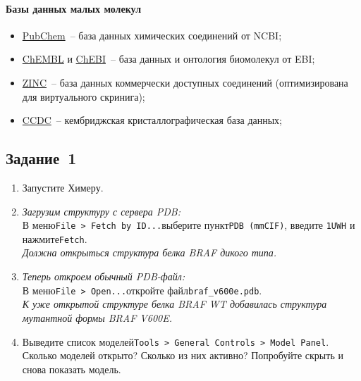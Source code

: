 \paragraph{Базы данных малых молекул}
\begin{itemize}
    \item \href{https://pubchem.ncbi.nlm.nih.gov/}{PubChem}~-- база данных химических соединений от NCBI;
    \item \href{https://www.ebi.ac.uk/chembl/}{ChEMBL} и \href{https://www.ebi.ac.uk/chebi/}{ChEBI}~-- база данных и онтология биомолекул от EBI;
    \item \href{http://zinc15.docking.org}{ZINC}~-- база данных коммерчески доступных соединений (оптимизирована для виртуального скринига);
    \item \href{https://www.ccdc.cam.ac.uk}{CCDC}~-- кембриджская кристаллографическая база данных;
\end{itemize}

\subsection*{Задание~1}
\begin{enumerate}
    \item Запустите Химеру.
    
    \item \textit{Загрузим структуру с сервера PDB:}\\
        В меню\quad\texttt{File~> Fetch by ID...}\quad выберите пункт\quad\texttt{PDB (mmCIF)}, введите \texttt{1UWH}
        и нажмите\quad\texttt{Fetch}.\\
        \textit{Должна открыться структура белка BRAF дикого типа.}
    
    \item \textit{Теперь откроем обычный PDB-файл:}\\
        В меню\quad\texttt{File~> Open...}\quad откройте файл\quad\texttt{braf\_v600e.pdb}.\\
        \textit{К уже открытой структуре белка BRAF WT добавилась структура мутантной формы BRAF V600E.} 
        
    \item Выведите список моделей\quad\texttt{Tools~> General Controls~> Model Panel}.\\
        Сколько моделей открыто? Сколько из них активно? Попробуйте скрыть и снова показать модель.
\end{enumerate}
